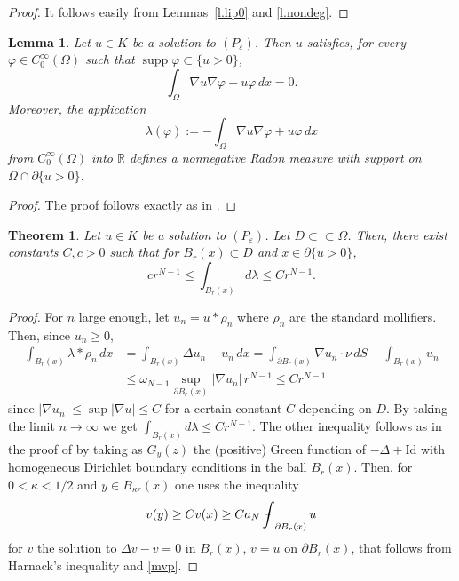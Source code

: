 \documentclass[11pt]{amsart}
\newtheorem{theorem}{Theorem}[section]
\newtheorem{lemma}{Lemma}[section]
\theoremstyle{definition}
\theoremstyle{remark}
\numberwithin{equation}{section}
\newcommand{\R}{\mathbb{R}}
\DeclareMathOperator{\supp}{supp}
\newcommand{\avint}{\mathop{\,\rlap{--}\!\!\int}\nolimits}
\begin{document}
\begin{proof}
It follows easily from Lemmas~\ref{l.lip0} and \ref{l.nondeg}.
\end{proof}

\begin{lemma}\label{l.measure}
Let $u\in K$ be a solution to $(P_\varepsilon)$. Then $u$ satisfies, for every $\varphi\in C^\infty_0(\Omega)$ such that $\supp\varphi\subset\{u>0\}$,
\begin{equation}\label{213}
\int_\Omega\nabla u\nabla\varphi+u\varphi\,dx=0.
\end{equation}
Moreover, the application
\[
\lambda(\varphi):=-\int_\Omega\nabla u\nabla\varphi+u\varphi\,dx
\]
from $C^\infty_0(\Omega)$ into $\R$ defines a nonnegative Radon measure with support on $\Omega\cap\partial\{u>0\}$.
\end{lemma}

\begin{proof}
The proof follows exactly as in \cite[Lemma~4.2]{AC}.
\end{proof}

\begin{theorem}\label{t.growth}
Let $u\in K$ be a solution to $(P_\varepsilon)$. Let $D\subset\subset\Omega$. Then, there exist constants $C,c>0$ such that for $B_r(x)\subset D$ and $x\in\partial\{u>0\}$,
\[
cr^{N-1}\le\int_{B_r(x)}d\lambda\le Cr^{N-1}.
\]
\end{theorem}

\begin{proof}
For $n$ large enough, let $u_n=u*\rho_n$ where $\rho_n$ are the standard mollifiers. Then, since $u_n\ge0$,
\begin{align*}
\int_{B_r(x)}\lambda*\rho_n\,dx&=\int_{B_r(x)}\Delta u_n-u_n\,dx=\int_{\partial B_r(x)}\nabla u_n\cdot\nu\,dS-\int_{B_r(x)}u_n\\
&\le\omega_{N-1}\sup_{\partial B_r(x)}|\nabla u_n|\,r^{N-1}\le Cr^{N-1}
\end{align*}
since $|\nabla u_n|\le\sup|\nabla u|\le C$ for a certain constant $C$ depending on $D$. By taking the limit $n\to\infty$ we get $\int_{B_r(x)}d\lambda\le Cr^{N-1}$. The other inequality follows as in the proof of \cite[Theorem~4.3]{AC} by taking as $G_y(z)$ the (positive) Green function of $-\Delta+\mathrm{Id}$ with homogeneous Dirichlet boundary conditions in the ball $B_r(x)$. Then, for $0<\kappa<1/2$ and $y\in B_{\kappa r}(x)$ one uses the inequality
\[
v(y)\ge Cv(x)\ge Ca_N\avint_{\partial B_r(x)}u
\]
for $v$ the solution to $\Delta v-v=0$ in $B_r(x)$, $v=u$ on $\partial B_r(x)$, that follows from Harnack's inequality and \eqref{mvp}.
\end{proof}
\end{document}
